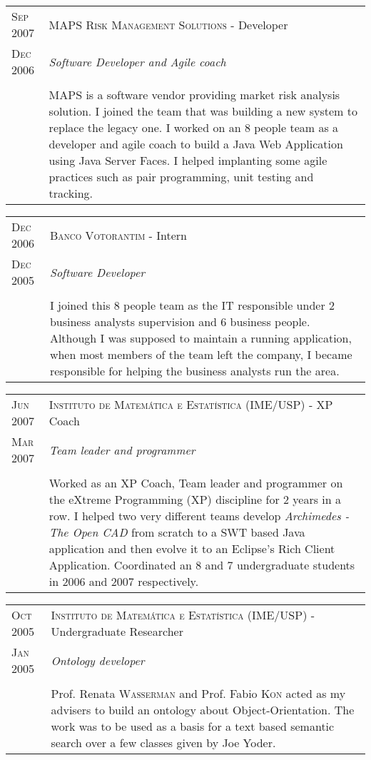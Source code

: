 \documentclass[letter,10pt]{article}
\begin{document}
\begin{tabular}{p{2.5cm}|p{13.5cm}}
  \textsc{Sep 2007} & \textsc{MAPS Risk
    Management Solutions} - Developer\\
  \textsc{Dec 2006} &\emph{Software Developer and Agile coach}\\
  &\\
  & MAPS is a software vendor providing market risk
  analysis solution. I joined the team that was building a new
  system to replace the legacy one. I worked on an 8 people team as a
  developer and agile coach to build a Java Web Application using
  Java Server Faces. I helped implanting some agile practices such as pair programming, unit
  testing and tracking.
\end{tabular}

\begin{tabular}{p{2.5cm}|p{13.5cm}}
  \textsc{Dec 2006} & \textsc{Banco Votorantim} - Intern\\
  \textsc{Dec 2005} &\emph{Software Developer}\\
  &\\
  &I joined this 8 people team as the IT responsible
  under 2 business analysts supervision and 6 business
  people. Although I was supposed to maintain a
  running application, when most members of the team left the company,
  I became responsible for helping the business analysts run the
  area.
\end{tabular}

\begin{tabular}{p{2.5cm}|p{13.5cm}}
  \textsc{Jun 2007} & \textsc{Instituto de Matemática e Estatística
    (IME/USP)} - XP Coach\\
  \textsc{Mar 2007}& \emph{Team leader and programmer}\\
  &\\
  &  Worked as an XP Coach, Team leader and programmer on the eXtreme
  Programming (XP) discipline for
  2 years in a row. I helped two very different teams develop
  \emph{Archimedes - The Open CAD} from scratch to a SWT based Java
  application and then evolve it to an Eclipse's Rich Client
  Application. Coordinated an 8 and 7 undergraduate students in
  2006 and 2007 respectively.
\end{tabular}

\begin{tabular}{p{2.5cm}|p{13.5cm}}
  \textsc{Oct 2005} & \textsc{Instituto de Matemática e Estatística
    (IME/USP)} - Undergraduate Researcher\\
  \textsc{Jan 2005}& \emph{Ontology developer}\\
  &\\
  & Prof. Renata \textsc{Wasserman} and Prof. Fabio \textsc{Kon} acted as my
  advisers to build an ontology about Object-Orientation. The work
  was to be used as a basis for a text based semantic search over a
  few classes given by Joe Yoder.
\end{tabular}
\end{document}
